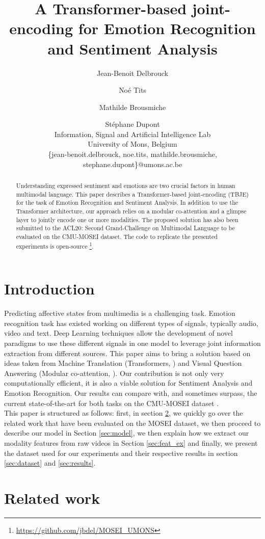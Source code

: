 \documentclass[11pt,a4paper]{article}
\title{A Transformer-based joint-encoding for Emotion Recognition and Sentiment Analysis}
\author{Jean-Benoit Delbrouck \and No\'e Tits \and Mathilde Brousmiche \and St\'ephane Dupont \\
          Information, Signal and Artificial Intelligence Lab\\
          University of Mons, Belgium\\
          \{jean-benoit.delbrouck, noe.tits, mathilde.brousmiche,  stephane.dupont\}@umons.ac.be}
\date{}
\begin{document}
\maketitle
\begin{abstract}
Understanding expressed sentiment and emotions are two crucial factors in human multimodal language. This paper describes a Transformer-based joint-encoding (TBJE) for the task of Emotion Recognition and Sentiment Analysis. In addition to use the Transformer architecture, our approach relies on a modular co-attention and a glimpse layer to jointly encode one or more modalities. The proposed solution has also been submitted to the ACL20: Second Grand-Challenge on Multimodal Language to be evaluated on the CMU-MOSEI dataset. The code to replicate the presented experiments is open-source \footnote{\url{https://github.com/jbdel/MOSEI_UMONS}}.
\end{abstract}

\section{Introduction}

Predicting affective states from multimedia is a challenging task. Emotion recognition task has existed working on different types of signals, typically audio, video and text. Deep Learning techniques allow the development of novel paradigms to use these different signals in one model to leverage joint information extraction from different sources. This paper aims to bring a solution based on ideas taken from Machine Translation (Transformers, \citet{vaswani2017attention}) and Visual Question Answering (Modular co-attention, \citet{yu2019deep}). Our contribution is not only very computationally efficient, it is also a viable solution for Sentiment Analysis and Emotion Recognition. Our results can compare with, and sometimes surpass, the current state-of-the-art for both tasks on the CMU-MOSEI dataset \cite{bagher-zadeh-etal-2018-multimodal}. \\

This paper is structured as follows: first, in section \ref{sec:related}, we quickly go over the related work that have been evaluated on the MOSEI dataset, we then proceed to describe our model in Section \ref{sec:model}, we then explain how we extract our modality features from raw videos in Section \ref{sec:feat_ex} and finally, we present the dataset used for our experiments and their respective results in section \ref{sec:dataset} and \ref{sec:results}.
\section{Related work}
\label{sec:related}
\end{document}

